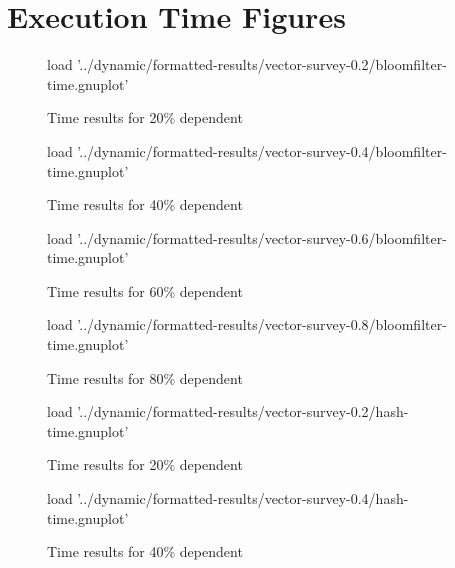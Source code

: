 \chapter{Execution Time Figures} \label{chp:appndx:time-figs}
\begin{figure}[H]
	\centering
	\begin{gnuplot}[terminal=pdf]
	load '../dynamic/formatted-results/vector-survey-0.2/bloomfilter-time.gnuplot'
	\end{gnuplot}
	\caption{Time results for 20\% dependent}
	\label{chart:time-0.2-bloom}
\end{figure}


\begin{figure}[H]
	\centering
	\begin{gnuplot}[terminal=pdf]
	load '../dynamic/formatted-results/vector-survey-0.4/bloomfilter-time.gnuplot'
	\end{gnuplot}
	\caption{Time results for 40\% dependent}
	\label{chart:time-0.4-bloom}
\end{figure}

\begin{figure}[H]
	\centering
	\begin{gnuplot}[terminal=pdf]
	load '../dynamic/formatted-results/vector-survey-0.6/bloomfilter-time.gnuplot'
	\end{gnuplot}
	\caption{Time results for 60\% dependent}
	\label{chart:time-0.6-bloom}
\end{figure}

\begin{figure}[H]
	\centering
	\begin{gnuplot}[terminal=pdf]
	load '../dynamic/formatted-results/vector-survey-0.8/bloomfilter-time.gnuplot'
	\end{gnuplot}
	\caption{Time results for 80\% dependent}
	\label{chart:time-0.8-bloom}
\end{figure}

\begin{figure}[H]
	\centering
	\begin{gnuplot}[terminal=pdf]
	load '../dynamic/formatted-results/vector-survey-0.2/hash-time.gnuplot'
	\end{gnuplot}
	\caption{Time results for 20\% dependent}
	\label{chart:time-0.2-hash}
\end{figure}


\begin{figure}[H]
	\centering
	\begin{gnuplot}[terminal=pdf]
	load '../dynamic/formatted-results/vector-survey-0.4/hash-time.gnuplot'
	\end{gnuplot}
	\caption{Time results for 40\% dependent}
	\label{chart:time-0.4-hash}
\end{figure}

